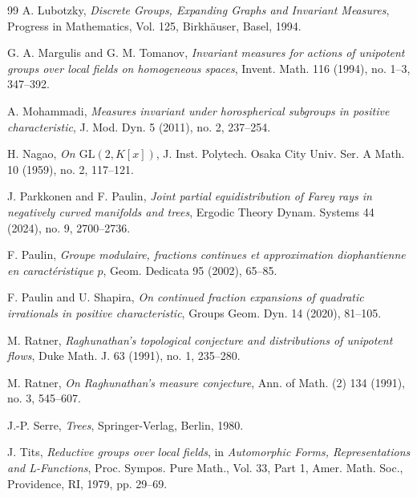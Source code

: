 \documentclass[11pt]{amsart}
\theoremstyle{definition}
\theoremstyle{plain}
\begin{document}
\begin{thebibliography}{99}
A. Lubotzky,
\emph{Discrete Groups, Expanding Graphs and Invariant Measures},
Progress in Mathematics, Vol. 125, Birkh\"{a}user, Basel, 1994.

G. A. Margulis and G. M. Tomanov,
\emph{Invariant measures for actions of unipotent groups over local fields on homogeneous spaces},
Invent. Math. 116 (1994), no. 1--3, 347--392.

A. Mohammadi,
\emph{Measures invariant under horospherical subgroups in positive characteristic},
J. Mod. Dyn. 5 (2011), no. 2, 237--254.


H. Nagao,
\emph{On \(\mathrm{GL}(2,K[x])\)},
J. Inst. Polytech. Osaka City Univ. Ser. A Math. 10 (1959), no. 2, 117--121.

J. Parkkonen and F. Paulin,
\emph{Joint partial equidistribution of Farey rays in negatively curved manifolds and trees},
Ergodic Theory Dynam. Systems 44 (2024), no. 9, 2700--2736.

F. Paulin,
\emph{Groupe modulaire, fractions continues et approximation diophantienne en caract\'eristique \(p\)},
Geom. Dedicata 95 (2002), 65--85.

F. Paulin and U. Shapira,
\emph{On continued fraction expansions of quadratic irrationals in positive characteristic},
Groups Geom. Dyn. 14 (2020), 81--105.

M. Ratner,
\emph{Raghunathan's topological conjecture and distributions of unipotent flows},
Duke Math. J. 63 (1991), no. 1, 235--280.

M. Ratner,
\emph{On Raghunathan's measure conjecture},
Ann. of Math. (2) 134 (1991), no. 3, 545--607.

J.-P. Serre,
\emph{Trees},
Springer-Verlag, Berlin, 1980.

J. Tits,
\emph{Reductive groups over local fields}, in
\emph{Automorphic Forms, Representations and L-Functions},
Proc. Sympos. Pure Math., Vol. 33, Part 1, Amer. Math. Soc., Providence, RI,
1979, pp. 29--69.

\end{thebibliography}
\end{document}
